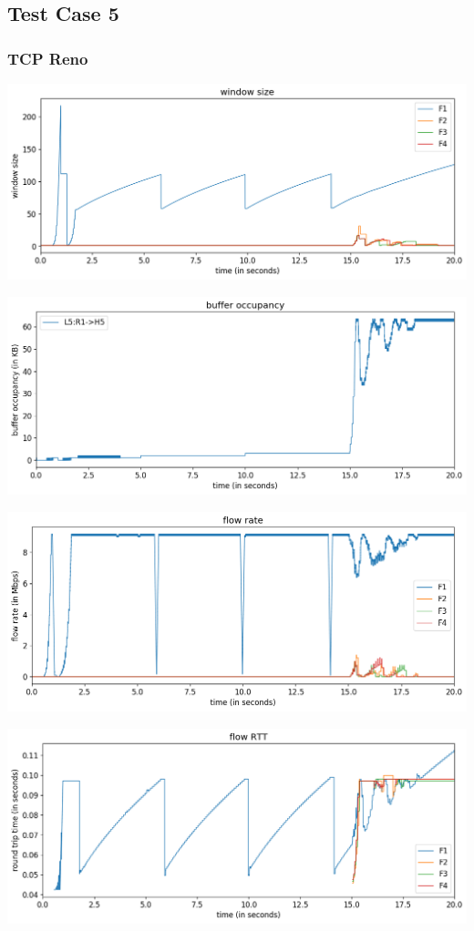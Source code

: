 \documentclass{article}
\begin{document}
\subsection{Test Case 5}

\subsubsection{TCP Reno}

\includegraphics[width = \textwidth]{"test_case5_reno window size"}

\includegraphics[width = \textwidth]{"test_case5_reno buffer occupancy"}

\includegraphics[width = \textwidth]{"test_case5_reno flow rate"}

\includegraphics[width = \textwidth]{"test_case5_reno flow RTT"}
\end{document}
